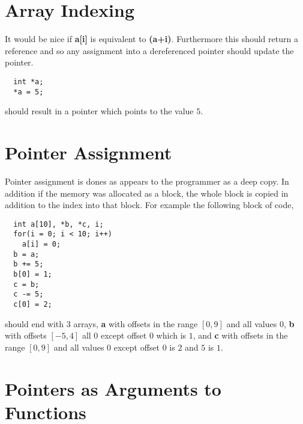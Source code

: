 \section{Array Indexing}
It would be nice if \textbf{a[i]} is equivalent to \textbf{\*(a+i)}. Furthermore this should return a reference and so any assignment into a dereferenced 
pointer should update the pointer.
\begin{verbatim}
  int *a;
  *a = 5;
\end{verbatim}
should result in a pointer which points to the value $5$.
\section{Pointer Assignment}
Pointer assignment is dones as appears to the programmer as a deep copy. In addition if the memory was allocated as a block, the whole block is copied in addition to the 
index into that block. For example the following block of code,
\begin{verbatim}
  int a[10], *b, *c, i;
  for(i = 0; i < 10; i++)
    a[i] = 0;
  b = a;
  b += 5;
  b[0] = 1;
  c = b;
  c -= 5;
  c[0] = 2;  
\end{verbatim}
should end with 3 arrays, \textbf{a} with offsets in the range $\left[0,9\right]$ and all values $0$, \textbf{b} with offsets $\left[-5,4\right]$ all $0$ except offset 
$0$ which is $1$, and \textbf{c} with offsets in the range $\left[0,9\right]$ and all values $0$ except offset $0$ is $2$ and $5$ is $1$.
\section{Pointers as Arguments to Functions}
